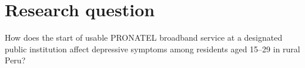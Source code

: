 \section{Research question}
How does the start of usable PRONATEL broadband service at a designated public
institution affect depressive symptoms among residents aged 15--29 in rural Peru?
